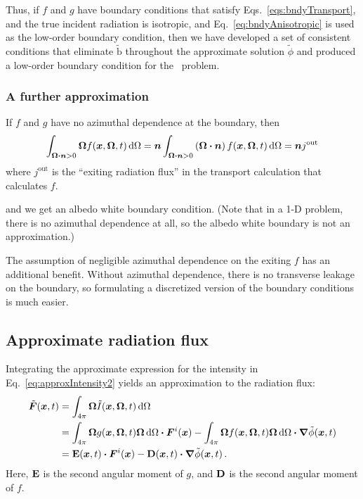 Thus, if $f$ and $g$ have boundary conditions that satisfy
Eqs.~\eqref{eqs:bndyTransport}, and the true incident radiation is isotropic,
and Eq.~\eqref{eq:bndyAnisotropic} is used as the low-order boundary condition,
then we have developed a set of consistent conditions that eliminate
$\mathrm{\tilde b}$ throughout the approximate solution $\tilde\phi$ and
produced a low-order boundary condition for the \APone\ problem.

\subsubsection{A further approximation}

If $f$ and $g$ have no azimuthal dependence at the boundary, then
\begin{equation*}
  \int_{\bm{\Omega} \bm{\cdot} \bm{n} > 0} \bm{\Omega}
  f(\bm{x}, \bm{\Omega}, t) \mathop{}\!\mathrm{d}\Omega
  = \bm{n} \int_{\bm{\Omega} \bm{\cdot} \bm{n} > 0}
  \left( \bm{\Omega} \bm{\cdot} \bm{n} \right)
  f(\bm{x}, \bm{\Omega}, t) \mathop{}\!\mathrm{d}\Omega
  = \bm{n} j^\textrm{out}
\end{equation*}
where $j^\textrm{out}$ is the ``exiting radiation flux'' in the transport
calculation that calculates $f$.

and we get an albedo white boundary condition. (Note that in a 1-D problem,
there is no azimuthal dependence at all, so the albedo white boundary is not an
approximation.)

The assumption of negligible azimuthal dependence on the exiting $f$ has an
additional benefit. Without azimuthal dependence, there is no transverse
leakage on the boundary, so formulating a discretized version of the boundary
conditions is much easier.

\subsection{Approximate radiation flux}
Integrating the approximate expression for the intensity in
Eq.~\eqref{eq:approxIntensity2} yields an approximation to the radiation flux:
\begin{align} \nonumber
  \tilde{\bm{F}} (\bm{x}, t)
  &= \int_{4\pi} \bm{\Omega} \tilde I(\bm{x}, \bm{\Omega}, t) \mathop{}\!\mathrm{d}\Omega
  \\ \nonumber
  &= 
  \int_{4\pi} \bm{\Omega} g(\bm{x}, \bm{\Omega}, t) \bm{\Omega} \mathop{}\!\mathrm{d}\Omega
  \bm{\cdot} \bm{F}^i(\bm{x})
  - \int_{4\pi} \bm{\Omega} f(\bm{x}, \bm{\Omega}, t) \bm{\Omega} \mathop{}\!\mathrm{d}\Omega
  \bm{\cdot} \bm{\nabla} \tilde \phi(\bm{x},t)
  \\ \label{eq:anisotropicP1}
  &= \mathbf{E}(\bm{x}, t) \bm{\cdot} \bm{F}^i(\bm{x})
  - \mathbf{D}(\bm{x}, t) \bm{\cdot} \bm{\nabla} \tilde \phi(\bm{x},t) \,.
\end{align}
Here, $\mathbf{E}$ is the second angular moment of $g$, and $\mathbf{D}$ is the second
angular moment of $f$.

